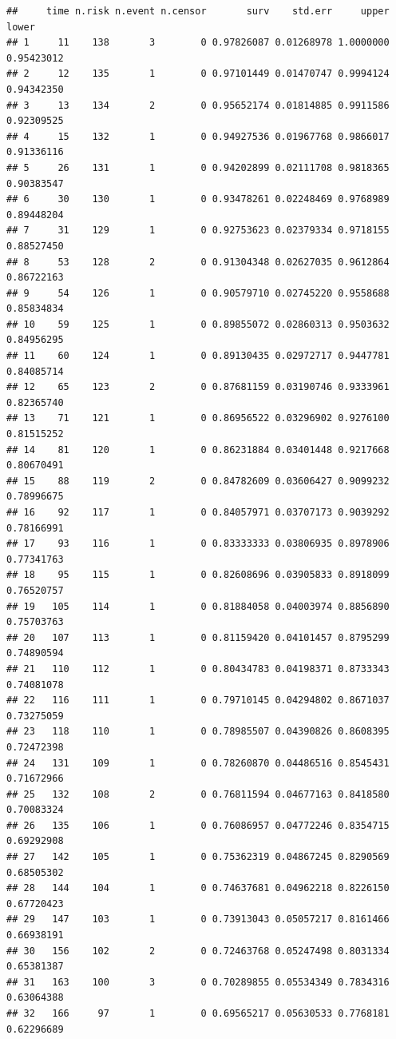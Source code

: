 \documentclass[
]{book}
\begin{document}
\begin{verbatim}
##     time n.risk n.event n.censor       surv    std.err     upper      lower
## 1     11    138       3        0 0.97826087 0.01268978 1.0000000 0.95423012
## 2     12    135       1        0 0.97101449 0.01470747 0.9994124 0.94342350
## 3     13    134       2        0 0.95652174 0.01814885 0.9911586 0.92309525
## 4     15    132       1        0 0.94927536 0.01967768 0.9866017 0.91336116
## 5     26    131       1        0 0.94202899 0.02111708 0.9818365 0.90383547
## 6     30    130       1        0 0.93478261 0.02248469 0.9768989 0.89448204
## 7     31    129       1        0 0.92753623 0.02379334 0.9718155 0.88527450
## 8     53    128       2        0 0.91304348 0.02627035 0.9612864 0.86722163
## 9     54    126       1        0 0.90579710 0.02745220 0.9558688 0.85834834
## 10    59    125       1        0 0.89855072 0.02860313 0.9503632 0.84956295
## 11    60    124       1        0 0.89130435 0.02972717 0.9447781 0.84085714
## 12    65    123       2        0 0.87681159 0.03190746 0.9333961 0.82365740
## 13    71    121       1        0 0.86956522 0.03296902 0.9276100 0.81515252
## 14    81    120       1        0 0.86231884 0.03401448 0.9217668 0.80670491
## 15    88    119       2        0 0.84782609 0.03606427 0.9099232 0.78996675
## 16    92    117       1        0 0.84057971 0.03707173 0.9039292 0.78166991
## 17    93    116       1        0 0.83333333 0.03806935 0.8978906 0.77341763
## 18    95    115       1        0 0.82608696 0.03905833 0.8918099 0.76520757
## 19   105    114       1        0 0.81884058 0.04003974 0.8856890 0.75703763
## 20   107    113       1        0 0.81159420 0.04101457 0.8795299 0.74890594
## 21   110    112       1        0 0.80434783 0.04198371 0.8733343 0.74081078
## 22   116    111       1        0 0.79710145 0.04294802 0.8671037 0.73275059
## 23   118    110       1        0 0.78985507 0.04390826 0.8608395 0.72472398
## 24   131    109       1        0 0.78260870 0.04486516 0.8545431 0.71672966
## 25   132    108       2        0 0.76811594 0.04677163 0.8418580 0.70083324
## 26   135    106       1        0 0.76086957 0.04772246 0.8354715 0.69292908
## 27   142    105       1        0 0.75362319 0.04867245 0.8290569 0.68505302
## 28   144    104       1        0 0.74637681 0.04962218 0.8226150 0.67720423
## 29   147    103       1        0 0.73913043 0.05057217 0.8161466 0.66938191
## 30   156    102       2        0 0.72463768 0.05247498 0.8031334 0.65381387
## 31   163    100       3        0 0.70289855 0.05534349 0.7834316 0.63064388
## 32   166     97       1        0 0.69565217 0.05630533 0.7768181 0.62296689

\end{verbatim}
\end{document}
